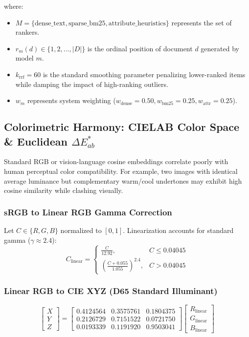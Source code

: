 \documentclass[11pt,a4paper]{article}
\begin{document}
where:
\begin{itemize}
    \item $M = \{\text{dense\_text}, \text{sparse\_bm25}, \text{attribute\_heuristics}\}$ represents the set of rankers.
    \item $r_m(d) \in \{1, 2, \dots, |D|\}$ is the ordinal position of document $d$ generated by model $m$.
    \item $k_{\text{rrf}} = 60$ is the standard smoothing parameter penalizing lower-ranked items while damping the impact of high-ranking outliers.
    \item $w_m$ represents system weighting ($w_{\text{dense}}=0.50, w_{\text{bm25}}=0.25, w_{\text{attr}}=0.25$).
\end{itemize}

\subsection{Colorimetric Harmony: CIELAB Color Space \& Euclidean $\Delta E^*_{ab}$}
Standard RGB or vision-language cosine embeddings correlate poorly with human perceptual color compatibility. For example, two images with identical average luminance but complementary warm/cool undertones may exhibit high cosine similarity while clashing visually.

\subsubsection{sRGB to Linear RGB Gamma Correction}
Let $C \in \{R, G, B\}$ normalized to $[0, 1]$. Linearization accounts for standard gamma ($\gamma \approx 2.4$):
\begin{equation}
C_{\text{linear}} = \begin{cases} 
\frac{C}{12.92}, & C \le 0.04045 \\
\left(\frac{C + 0.055}{1.055}\right)^{2.4}, & C > 0.04045 
\end{cases}
\end{equation}

\subsubsection{Linear RGB to CIE XYZ (D65 Standard Illuminant)}
\begin{equation}
\begin{bmatrix} X \\ Y \\ Z \end{bmatrix} = 
\begin{bmatrix} 
0.4124564 & 0.3575761 & 0.1804375 \\
0.2126729 & 0.7151522 & 0.0721750 \\
0.0193339 & 0.1191920 & 0.9503041 
\end{bmatrix}
\begin{bmatrix} R_{\text{linear}} \\ G_{\text{linear}} \\ B_{\text{linear}} \end{bmatrix}
\end{equation}
\end{document}
